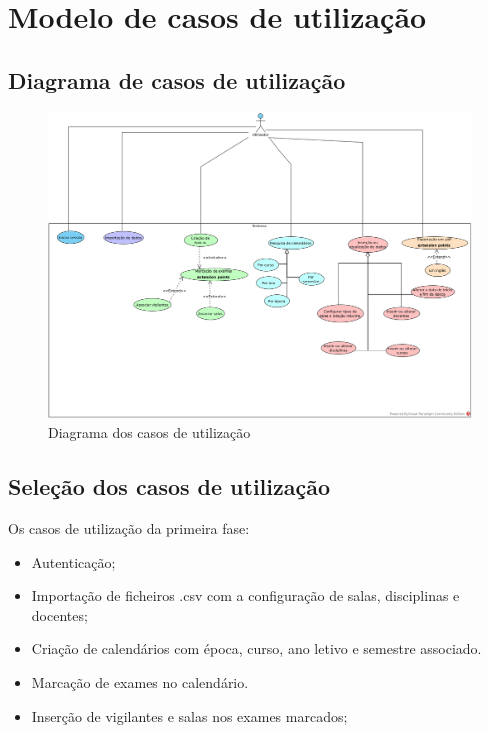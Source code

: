 \documentclass[11pt, twoside]{report}
\begin{document}
	
	\chapter{Modelo de casos de utilização}
	\section{Diagrama de casos de utilização}
	
\clearpage
\begin{landscape}
	\pagestyle{empty}
	
		\begin{figure}[H] 
			\centering 			\includegraphics[width=1.3\textwidth,height=1.3\textheight,keepaspectratio]{image/diagrama}
			\caption{Diagrama dos casos de utilização}
		
		\end{figure}
\end{landscape}


	\section{Seleção dos casos de utilização}
	\label{selecaocasosdeuso}
	Os casos de utilização da primeira fase:
	
	\begin{itemize}
		\item Autenticação;
		\item Importação de ficheiros .csv com a configuração de salas, disciplinas e docentes;
	 	\item Criação de calendários com época, curso, ano letivo e semestre associado.
	 	\item Marcação de exames no calendário.
	 	\item Inserção de vigilantes e salas nos exames marcados;
	 	
	\end{itemize}
	
\end{document}
